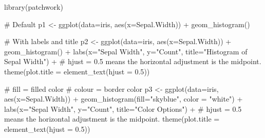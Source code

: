 \documentclass[
  letterpaper,
]{book}
\newenvironment{Shaded}{\begin{snugshade}}{\end{snugshade}}
\newcommand{\AttributeTok}[1]{\textcolor[rgb]{0.40,0.45,0.13}{#1}}
\newcommand{\CommentTok}[1]{\textcolor[rgb]{0.37,0.37,0.37}{#1}}
\newcommand{\FloatTok}[1]{\textcolor[rgb]{0.68,0.00,0.00}{#1}}
\newcommand{\FunctionTok}[1]{\textcolor[rgb]{0.28,0.35,0.67}{#1}}
\newcommand{\NormalTok}[1]{\textcolor[rgb]{0.00,0.23,0.31}{#1}}
\newcommand{\OtherTok}[1]{\textcolor[rgb]{0.00,0.23,0.31}{#1}}
\newcommand{\SpecialCharTok}[1]{\textcolor[rgb]{0.37,0.37,0.37}{#1}}
\newcommand{\StringTok}[1]{\textcolor[rgb]{0.13,0.47,0.30}{#1}}
\begin{document}
\begin{Shaded}
\begin{Highlighting}[]
\FunctionTok{library}\NormalTok{(patchwork)}

\CommentTok{\# Default}
\NormalTok{p1 }\OtherTok{\textless{}{-}} \FunctionTok{ggplot}\NormalTok{(}\AttributeTok{data=}\NormalTok{iris, }\FunctionTok{aes}\NormalTok{(}\AttributeTok{x=}\NormalTok{Sepal.Width)) }\SpecialCharTok{+}
        \FunctionTok{geom\_histogram}\NormalTok{()}

\CommentTok{\# With labels and title}
\NormalTok{p2 }\OtherTok{\textless{}{-}} \FunctionTok{ggplot}\NormalTok{(}\AttributeTok{data=}\NormalTok{iris, }\FunctionTok{aes}\NormalTok{(}\AttributeTok{x=}\NormalTok{Sepal.Width)) }\SpecialCharTok{+}
        \FunctionTok{geom\_histogram}\NormalTok{() }\SpecialCharTok{+}
        \FunctionTok{labs}\NormalTok{(}\AttributeTok{x=}\StringTok{"Sepal Width"}\NormalTok{, }\AttributeTok{y=}\StringTok{"Count"}\NormalTok{, }\AttributeTok{title=}\StringTok{"Histogram of Sepal Width"}\NormalTok{) }\SpecialCharTok{+}
        \CommentTok{\# hjust = 0.5 means the horizontal adjustment is the midpoint.}
        \FunctionTok{theme}\NormalTok{(}\AttributeTok{plot.title =} \FunctionTok{element\_text}\NormalTok{(}\AttributeTok{hjust =} \FloatTok{0.5}\NormalTok{))}

\CommentTok{\# fill = filled color}
\CommentTok{\# colour = border color}
\NormalTok{p3 }\OtherTok{\textless{}{-}} \FunctionTok{ggplot}\NormalTok{(}\AttributeTok{data=}\NormalTok{iris, }\FunctionTok{aes}\NormalTok{(}\AttributeTok{x=}\NormalTok{Sepal.Width)) }\SpecialCharTok{+}
        \FunctionTok{geom\_histogram}\NormalTok{(}\AttributeTok{fill=}\StringTok{"skyblue"}\NormalTok{, }\AttributeTok{color =} \StringTok{"white"}\NormalTok{) }\SpecialCharTok{+}
        \FunctionTok{labs}\NormalTok{(}\AttributeTok{x=}\StringTok{"Sepal Width"}\NormalTok{, }\AttributeTok{y=}\StringTok{"Count"}\NormalTok{, }\AttributeTok{title=}\StringTok{"Color Options"}\NormalTok{) }\SpecialCharTok{+}
        \CommentTok{\# hjust = 0.5 means the horizontal adjustment is the midpoint.}
        \FunctionTok{theme}\NormalTok{(}\AttributeTok{plot.title =} \FunctionTok{element\_text}\NormalTok{(}\AttributeTok{hjust =} \FloatTok{0.5}\NormalTok{))}


\end{Highlighting}
\end{Shaded}
\end{document}
